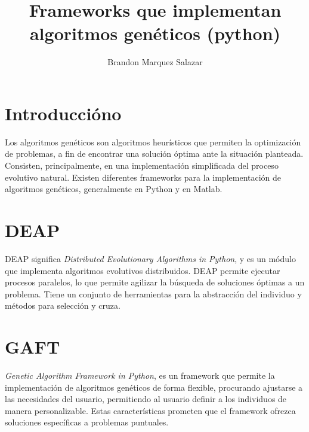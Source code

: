 \documentclass[10pt]{article}
\author{%
Brandon Marquez Salazar
}
\title{%
  Frameworks que implementan algoritmos genéticos (python)
}
\begin{document}
\maketitle

  \section*{Introduccióno}

  Los algoritmos genéticos son algoritmos heurísticos que permiten la
  optimización de problemas, a fin de encontrar una solución óptima ante
  la situación planteada. Consisten, principalmente, en una implementación
  simplificada del proceso evolutivo natural. Existen diferentes
  frameworks para la implementación de algoritmos genéticos, generalmente
  en Python y en Matlab.

  \section*{DEAP}

  DEAP significa \textit{Distributed Evolutionary Algorithms in Python},
  y es un módulo que implementa algoritmos evolutivos distribuidos. DEAP
  permite ejecutar procesos paralelos, lo que permite agilizar la búsqueda
  de soluciones óptimas a un problema. Tiene un conjunto de herramientas
  para la abstracción del individuo y métodos para selección y cruza.

  \section*{GAFT}

  \textit{Genetic Algorithm Framework in Python}, es un framework que
  permite la implementación de algoritmos genéticos de forma flexible,
  procurando ajustarse a las necesidades del usuario, permitiendo al
  usuario definir a los individuos de manera personalizable. Estas
  características prometen que el framework ofrezca soluciones específicas
  a problemas puntuales.
\end{document}
